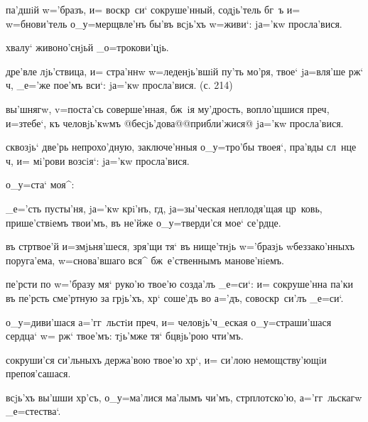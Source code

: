  па'дшiй w='бразъ, и= воскр~си` 
сокруше'нный, содjь'тель бг~ъ и= w=бнови'тель 
о_у=мерщвле'нъ бы'въ всjь'хъ w=живи`: jа='кw просла'вися.

    \kinovarsimple{[_е=гw'же}   хвалу` живоно'снjьй 
_о=трокови'цjь.\kinovarsimple{] Гла'съ в~.}


 дре'вле лjь'ствица, и= стра'ннw 
w=леденjь'вшiй пу'ть мо'ря, твое` jа=вля'ше рж` 
ч, _е='же пое'мъ вси`: jа='кw просла'вися. (с. 214)

 вы'шнягw, v=поста'сь соверше'нная, бж~iя 
му'дрость, вопло'щшися преч, и=з\ъ тебе`, къ 
человjь'кwмъ @бесjь'дова@{@прибли'жися@} jа='кw 
просла'вися.

 сквозjь` две'рь непрохо'дную, заключе'нныя 
о_у=тро'бы твоея`, пра'вды сл~нце ч, и= мi'рови 
возсiя`: jа='кw просла'вися.

  о_у=ста` моя^:


  _е='сть пусты'ня, jа='кw 
крi'нъ, гд, jа=зы'ческая неплодя'щая цр~ковь, 
прише'ствiемъ твои'мъ, въ не'йже о_у=тверди'ся мое` 
се'рдце.

 въ стр твое'й и=змjьня'шеся, зря'щи тя` 
въ нище'тнjь w='бразjь w\т беззако'нныхъ поруга'ема, 
w=снова'вшаго вся^ бж~е'ственнымъ манове'нiемъ.

 пе'рсти по w='бразу мя` руко'ю твое'ю созда'лъ 
_е=си`: и= сокруше'нна па'ки въ пе'рсть сме'ртную за 
грjь'хъ, хр` соше'дъ во а='дъ, совоскр~си'лъ _е=си`.

  о_у=диви'шася а='гг~льстiи 
преч, и= человjь'ч_еская о_у=страши'шася сердца` w= 
рж` твое'мъ: тjь'мже тя` бц вjь'рою чти'мъ.


  сокруши'ся си'льныхъ держа'вою 
твое'ю хр`, и= си'лою немощству'ющiи препоя'сашася.

 всjь'хъ вы'шши хр'съ, о_у=ма'лися 
ма'лымъ чи'мъ, стр плотско'ю, а='гг~льскагw 
_е=стества`.

